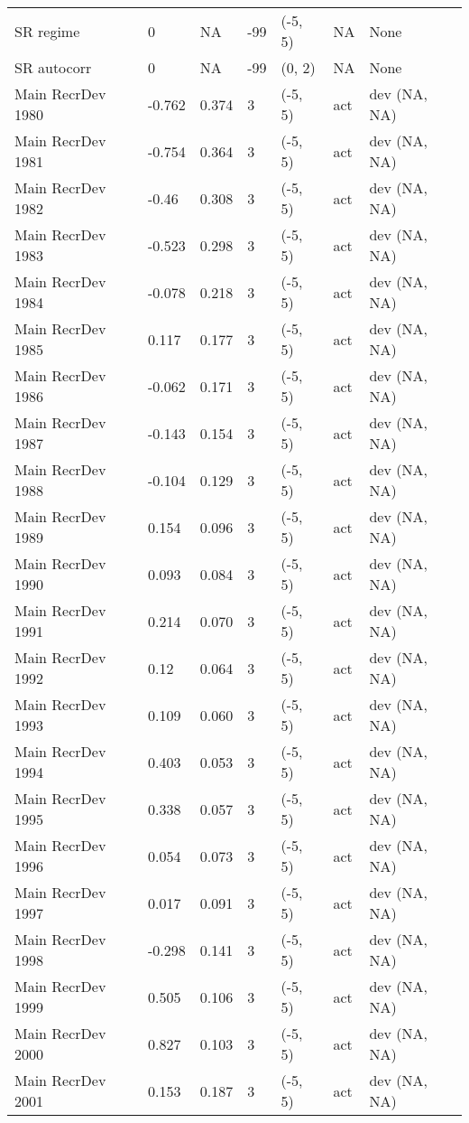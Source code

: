 \documentclass[11pt,
  english,
  letterpaper,
]{article}
\begin{document}
\begin{landscape}
\begin{longtable}[t]{>{\raggedright\arraybackslash}p{7.5cm}lllll>{\raggedright\arraybackslash}p{3.5cm}}
SR regime & 0 & NA & -99 & (-5, 5) & NA & None\\
SR autocorr & 0 & NA & -99 & (0, 2) & NA & None\\
Main RecrDev 1980 & -0.762 & 0.374 & 3 & (-5, 5) & act & dev (NA, NA)\\
Main RecrDev 1981 & -0.754 & 0.364 & 3 & (-5, 5) & act & dev (NA, NA)\\
Main RecrDev 1982 & -0.46 & 0.308 & 3 & (-5, 5) & act & dev (NA, NA)\\
Main RecrDev 1983 & -0.523 & 0.298 & 3 & (-5, 5) & act & dev (NA, NA)\\
Main RecrDev 1984 & -0.078 & 0.218 & 3 & (-5, 5) & act & dev (NA, NA)\\
Main RecrDev 1985 & 0.117 & 0.177 & 3 & (-5, 5) & act & dev (NA, NA)\\
Main RecrDev 1986 & -0.062 & 0.171 & 3 & (-5, 5) & act & dev (NA, NA)\\
Main RecrDev 1987 & -0.143 & 0.154 & 3 & (-5, 5) & act & dev (NA, NA)\\
Main RecrDev 1988 & -0.104 & 0.129 & 3 & (-5, 5) & act & dev (NA, NA)\\
Main RecrDev 1989 & 0.154 & 0.096 & 3 & (-5, 5) & act & dev (NA, NA)\\
Main RecrDev 1990 & 0.093 & 0.084 & 3 & (-5, 5) & act & dev (NA, NA)\\
Main RecrDev 1991 & 0.214 & 0.070 & 3 & (-5, 5) & act & dev (NA, NA)\\
Main RecrDev 1992 & 0.12 & 0.064 & 3 & (-5, 5) & act & dev (NA, NA)\\
Main RecrDev 1993 & 0.109 & 0.060 & 3 & (-5, 5) & act & dev (NA, NA)\\
Main RecrDev 1994 & 0.403 & 0.053 & 3 & (-5, 5) & act & dev (NA, NA)\\
Main RecrDev 1995 & 0.338 & 0.057 & 3 & (-5, 5) & act & dev (NA, NA)\\
Main RecrDev 1996 & 0.054 & 0.073 & 3 & (-5, 5) & act & dev (NA, NA)\\
Main RecrDev 1997 & 0.017 & 0.091 & 3 & (-5, 5) & act & dev (NA, NA)\\
Main RecrDev 1998 & -0.298 & 0.141 & 3 & (-5, 5) & act & dev (NA, NA)\\
Main RecrDev 1999 & 0.505 & 0.106 & 3 & (-5, 5) & act & dev (NA, NA)\\
Main RecrDev 2000 & 0.827 & 0.103 & 3 & (-5, 5) & act & dev (NA, NA)\\
Main RecrDev 2001 & 0.153 & 0.187 & 3 & (-5, 5) & act & dev (NA, NA)\\

\end{longtable}
\end{landscape}
\end{document}
